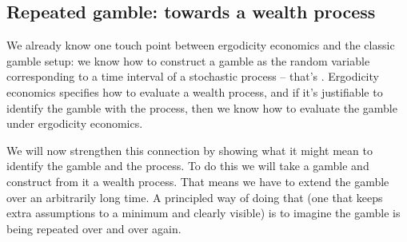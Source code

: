 \subsection{Repeated gamble: towards a wealth process}

We already know one touch point between ergodicity economics and 
the classic gamble setup: we know how to construct a gamble as the random variable 
corresponding to a time interval of a stochastic process -- that's .
Ergodicity economics specifies how to evaluate a wealth process, and if
it's justifiable to identify the gamble with the process, then we know how to evaluate 
the gamble under ergodicity economics. 

We will now strengthen this connection by showing what it might mean to identify the gamble 
and the process. To do this we will take a gamble and construct from it a 
wealth process. That means we have to extend the gamble over an arbitrarily long time. 
A principled way of doing that (one that keeps extra assumptions to a minimum and clearly visible)
is to imagine the gamble is being repeated over and over again. 

